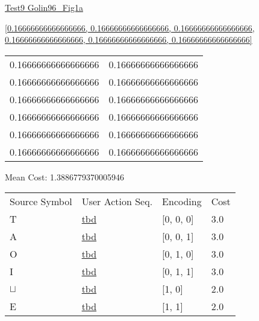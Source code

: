 \documentclass[12pt]{article}
\begin{document}
\noindent \url{Test9 Golin96_Fig1a}

\noindent \url{[0.16666666666666666, 0.16666666666666666, 0.16666666666666666, 0.16666666666666666, 0.16666666666666666, 0.16666666666666666]}

\noindent\begin{tt}
\begin{small}
\begin{bundle}{}
\end{bundle}
\end{small}
\end{tt}
\newpage%
\begin{tabular}{l l}0.16666666666666666	&	0.16666666666666666\\
0.16666666666666666	&	0.16666666666666666\\
0.16666666666666666	&	0.16666666666666666\\
0.16666666666666666	&	0.16666666666666666\\
0.16666666666666666	&	0.16666666666666666\\
0.16666666666666666	&	0.16666666666666666\\
\end{tabular}\newpage
\noindent
\noindent Mean Cost: 1.3886779370005946\\
\begin{tabular}{l l l l}
Source Symbol	&	User Action Seq.	&	Encoding	&	Cost\\
T	&	\url{tbd}	&	[0, 0, 0]	&	3.0\\
A	&	\url{tbd}	&	[0, 0, 1]	&	3.0\\
O	&	\url{tbd}	&	[0, 1, 0]	&	3.0\\
I	&	\url{tbd}	&	[0, 1, 1]	&	3.0\\
$\sqcup$	&	\url{tbd}	&	[1, 0]	&	2.0\\
E	&	\url{tbd}	&	[1, 1]	&	2.0\\
\end{tabular}
\end{document}
